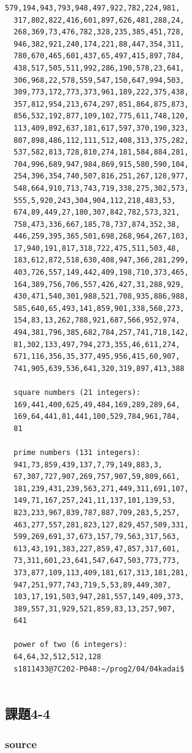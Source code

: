 \documentclass[10pt,a4paper]{jsarticle}
\begin{document}
\begin{lstlisting}[basicstyle=\ttfamily\footnotesize,frame=single]
  579,194,943,793,948,497,922,782,224,981,
  317,802,822,416,601,897,626,481,288,24,
  268,369,73,476,782,328,235,385,451,728,
  946,382,921,240,174,221,88,447,354,311,
  780,670,465,601,437,65,497,415,897,784,
  438,517,505,511,992,286,190,578,23,641,
  306,968,22,578,559,547,150,647,994,503,
  309,773,172,773,373,961,189,222,375,438,
  357,812,954,213,674,297,851,864,875,873,
  856,532,192,877,109,102,775,611,748,120,
  113,409,892,637,181,617,597,370,190,323,
  807,898,486,112,111,512,408,313,375,282,
  537,582,813,728,810,274,181,584,884,281,
  704,996,689,947,984,869,915,580,590,104,
  254,396,354,740,507,816,251,267,128,977,
  548,664,910,713,743,719,338,275,302,573,
  555,5,920,243,304,904,112,218,483,53,
  674,89,449,27,180,307,842,782,573,321,
  758,473,336,667,185,78,737,874,352,38,
  446,259,395,365,501,698,268,964,267,103,
  17,940,191,817,318,722,475,511,503,48,
  183,612,872,518,630,408,947,366,281,299,
  403,726,557,149,442,409,198,710,373,465,
  164,389,756,706,557,426,427,31,288,929,
  430,471,540,301,988,521,708,935,886,988,
  585,640,65,493,141,859,901,338,568,273,
  154,83,13,262,788,921,687,566,952,974,
  494,381,796,385,682,784,257,741,718,142,
  81,302,133,497,794,273,355,46,611,274,
  671,116,356,35,377,495,956,415,60,907,
  741,905,639,536,641,320,319,897,413,388

  square numbers (21 integers):
  169,441,400,625,49,484,169,289,289,64,
  169,64,441,81,441,100,529,784,961,784,
  81

  prime numbers (131 integers):
  941,73,859,439,137,7,79,149,883,3,
  67,307,727,907,269,757,907,59,809,661,
  181,239,431,239,563,271,449,311,691,107,
  149,71,167,257,241,11,137,101,139,53,
  823,233,967,839,787,887,709,283,5,257,
  463,277,557,281,823,127,829,457,509,331,
  599,269,691,37,673,157,79,563,317,563,
  613,43,191,383,227,859,47,857,317,601,
  73,311,601,23,641,547,647,503,773,773,
  373,877,109,113,409,181,617,313,181,281,
  947,251,977,743,719,5,53,89,449,307,
  103,17,191,503,947,281,557,149,409,373,
  389,557,31,929,521,859,83,13,257,907,
  641

  power of two (6 integers):
  64,64,32,512,512,128
  s1811433@7C202-P048:~/prog2/04/04kadai$
  
\end{lstlisting}

\subsection{課題4-4}

\subsubsection{source}

\end{document}
